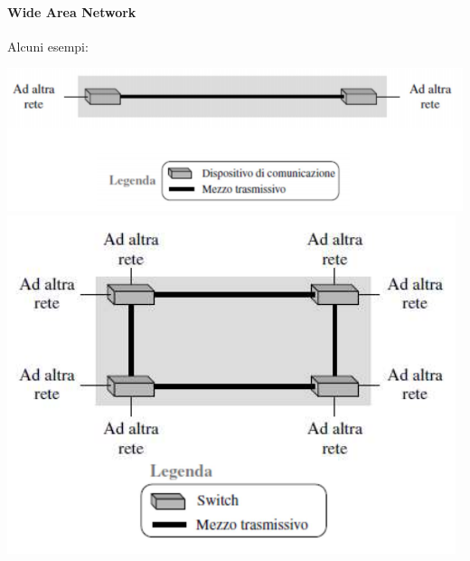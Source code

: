 \documentclass[10pt]{article}
\begin{document}
\paragraph{Wide Area Network} Alcuni esempi:\\
\begin{multicols}{2}
\includegraphics[scale=0.5]{wan1.png}\\
\columnbreak
\includegraphics[scale=0.5]{wan2.png}\\
\end{multicols}
\end{document}
